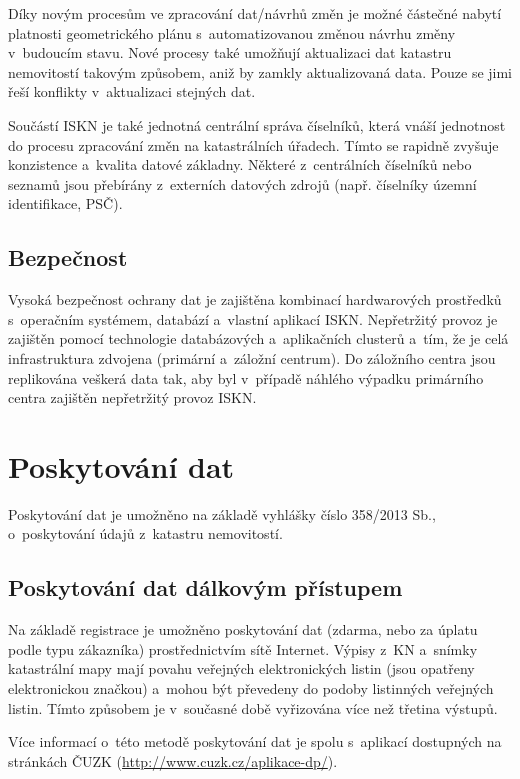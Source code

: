 \documentclass[a4paper,12pt,oneside]{book}
\begin{document}
Díky novým procesům ve zpracování dat/návrhů změn je možné částečné nabytí platnosti geometrického plánu s~automatizovanou změnou návrhu změny v~budoucím stavu. Nové procesy také umožňují aktualizaci dat katastru nemovitostí takovým způsobem, aniž by zamkly aktualizovaná data. Pouze se jimi řeší konflikty v~aktualizaci stejných dat.

Součástí ISKN je také jednotná centrální správa číselníků, která vnáší jednotnost do procesu zpracování změn na katastrálních úřadech. Tímto se rapidně zvyšuje konzistence a~kvalita datové základny. Některé z~centrálních číselníků nebo seznamů jsou přebírány z~externích datových zdrojů (např. číselníky územní identifikace, PSČ). \cite{iskn}

\subsection{Bezpečnost}

Vysoká bezpečnost ochrany dat je zajištěna kombinací hardwarových prostředků s~operačním systémem, databází a~vlastní aplikací ISKN. Nepřetržitý provoz je zajištěn pomocí technologie databázových a~aplikačních clusterů a~tím, že je celá infrastruktura zdvojena (primární a~záložní centrum). Do záložního centra jsou replikována veškerá data tak, aby byl v~případě náhlého výpadku primárního centra zajištěn nepřetržitý provoz ISKN. \cite{iskn}


\section{Poskytování dat}

Poskytování dat je umožněno na základě vyhlášky číslo 358/2013 Sb., o~poskytování údajů z~katastru nemovitostí. \cite{iskn}

\subsection{Poskytování dat dálkovým přístupem}

Na základě registrace je umožněno poskytování dat (zdarma, nebo za úplatu podle typu zákazníka) prostřednictvím sítě Internet. Výpisy z~KN a~snímky katastrální mapy mají povahu veřejných elektronických listin (jsou opatřeny elektronickou značkou) a~mohou být převedeny do podoby listinných veřejných listin. Tímto způsobem je v~současné době vyřizována více než třetina výstupů. \cite{iskn}

Více informací o~této metodě poskytování dat je spolu s~aplikací dostupných na stránkách ČUZK (\url{http://www.cuzk.cz/aplikace-dp/}).
\end{document}
